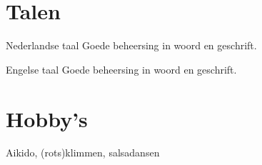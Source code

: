 \section*{Talen}

	\begin{languageList}
		\item[Nederlandse taal] Goede beheersing in woord en geschrift.
		\item[Engelse taal] Goede beheersing in woord en geschrift.
	\end{languageList}

\section*{Hobby's}
	
	Aikido, (rots)klimmen, salsadansen


